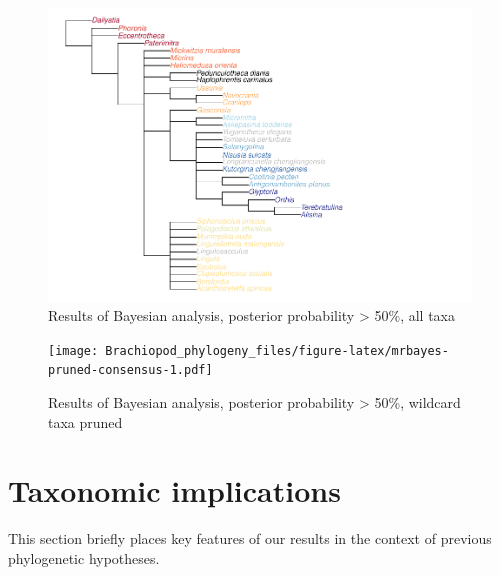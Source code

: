 \documentclass[openany]{book}
\theoremstyle{definition}
\theoremstyle{definition}
\theoremstyle{definition}
\theoremstyle{remark}
\begin{document}
\begin{figure}
\centering
\includegraphics{Brachiopod_phylogeny_files/figure-latex/mrbayes-full-consensus-1.pdf}
\caption{\label{fig:mrbayes-full-consensus}Results of Bayesian analysis,
posterior probability \textgreater{} 50\%, all taxa}
\end{figure}

\begin{figure}
\centering
\texttt{[image: Brachiopod\_phylogeny\_files/figure-latex/mrbayes-pruned-consensus-1.pdf]}
\caption{\label{fig:mrbayes-pruned-consensus}Results of Bayesian analysis,
posterior probability \textgreater{} 50\%, wildcard taxa pruned}
\end{figure}

\chapter{Taxonomic implications}\label{taxonomic-implications}

This section briefly places key features of our results in the context
of previous phylogenetic hypotheses.
\end{document}
